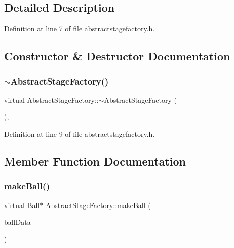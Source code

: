\subsection{Detailed Description}


Definition at line 7 of file abstractstagefactory.\+h.



\subsection{Constructor \& Destructor Documentation}
\mbox{\label{class_abstract_stage_factory_a7a38775e61d51152b2331c83b6815404}} 
\subsubsection{\texorpdfstring{$\sim$\+Abstract\+Stage\+Factory()}{~AbstractStageFactory()}}
{\footnotesize\ttfamily virtual Abstract\+Stage\+Factory\+::$\sim$\+Abstract\+Stage\+Factory (\begin{DoxyParamCaption}{ }\end{DoxyParamCaption})\hspace{0.3cm}{\ttfamily [inline]}, {\ttfamily [virtual]}}



Definition at line 9 of file abstractstagefactory.\+h.



\subsection{Member Function Documentation}
\mbox{\label{class_abstract_stage_factory_a23367d64366e679aaff865620f5ce1ab}} 
\subsubsection{\texorpdfstring{make\+Ball()}{makeBall()}}
{\footnotesize\ttfamily virtual \mbox{\hyperlink{class_ball}{Ball}}$\ast$ Abstract\+Stage\+Factory\+::make\+Ball (\begin{DoxyParamCaption}\item[{const Q\+Json\+Object \&}]{ball\+Data }\end{DoxyParamCaption})\hspace{0.3cm}{\ttfamily [pure virtual]}}



